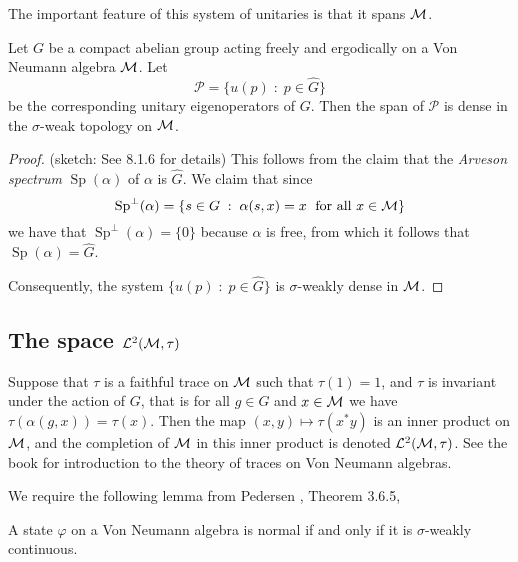 The important feature of this system of unitaries is that it spans
$\mathcal{M}$. 
\begin{proposition}
\label{densePolynomials}
    Let $G$ be a compact abelian group acting freely and ergodically 
    on a Von Neumann algebra $\mathcal{M}$. Let
    \begin{equation}
        \mathcal{P} = \{ u(p)\;:\; p \in \widehat{G}\}
    \end{equation}
    be the corresponding unitary eigenoperators of $G$. Then the span
    of $\mathcal{P}$ is dense in the $\sigma$-weak topology on $\mathcal{M}$.
\end{proposition}
\begin{proof}
    (sketch: See \cite{Pedersen1979} 8.1.6 for details) This follows from the claim that the \emph{Arveson spectrum}
    $\operatorname{Sp}(\alpha)$
    of $\alpha$ is $\widehat{G}$. We claim that since
    \begin{equation}
        \operatorname{Sp}^{\perp}(\alpha) = \{ s \in G\;:\; \alpha(s,x) = x\;\text{ for all }x \in \mathcal{M}\}
    \end{equation} 
    we have that $\operatorname{Sp}^\perp(\alpha) = \{0\}$ because $\alpha$
    is free,
    from which it follows that $\operatorname{Sp}(\alpha) = \widehat{G}$.
    
    Consequently, the system $\{u(p)\;:\; p \in \widehat{G}\}$ is $\sigma$-weakly
    dense in $\mathcal{M}$.
\end{proof}

\subsection{The space $\mathcal{L}^2(\mathcal{M},\tau)$}
Suppose that $\tau$ is a faithful trace on $\mathcal{M}$ such that $\tau(1) = 1$,
and $\tau$ is invariant under the action of $G$, that is for
all $g \in G$ and $x \in \mathcal{M}$ we have $\tau(\alpha(g,x)) = \tau(x)$. 
Then the map $(x,y)\mapsto \tau(x^*y)$ is an inner product on $\mathcal{M}$,
and the completion of $\mathcal{M}$ in this inner product is denoted $\mathcal{L}^2(\mathcal{M},\tau)$.
See the book \cite[Ch. 1]{SingularTraces} for introduction
to the theory of traces on Von Neumann algebras.


We require the following lemma from Pedersen \cite{Pedersen1979},
Theorem 3.6.5,
\begin{lemma}
\label{pedersenLemma}
    A state $\varphi$ on a Von Neumann algebra is normal if and only if it is
    $\sigma$-weakly continuous.
\end{lemma}


